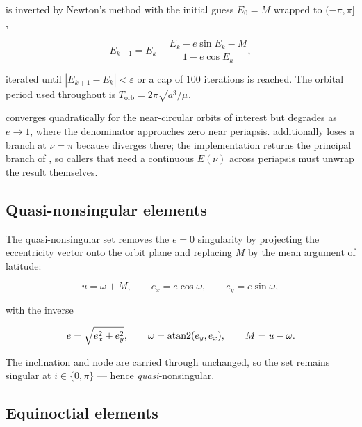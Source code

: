  is inverted by Newton's method with the initial guess
$E_0=M$ wrapped to $(-\pi,\pi]$,

\begin{equation}
  \label{eq:dyn-kepler-newton}
  E_{k+1} = E_k - \frac{E_k - e\sin E_k - M}{1 - e\cos E_k},
\end{equation}

iterated until $|E_{k+1}-E_k| < \varepsilon$ or a cap of $100$ iterations is
reached. The orbital period used throughout is
$T_\mathrm{orb} = 2\pi\sqrt{a^3/\mu}$.

\begin{lupntnote}
   converges quadratically for the near-circular
  orbits of interest but degrades as $e\rightarrow1$, where the denominator
  approaches zero near periapsis.  additionally loses a
  branch at $\nu=\pi$ because  diverges there; the implementation
  returns the principal branch of , so callers that need a continuous
  $E(\nu)$ across periapsis must unwrap the result themselves.
\end{lupntnote}

\subsection{Quasi-nonsingular elements}
\label{sec:dyn-qnsoe}

The quasi-nonsingular set removes the $e=0$ singularity by projecting the
eccentricity vector onto the orbit plane and replacing $M$ by the mean argument
of latitude:

\begin{equation}
  \label{eq:dyn-qnsoe}
  u = \omega + M, \qquad e_x = e\cos\omega, \qquad e_y = e\sin\omega,
\end{equation}

with the inverse

\begin{equation}
  \label{eq:dyn-qnsoe-inv}
  e = \sqrt{e_x^2+e_y^2}, \qquad \omega = \operatorname{atan2}(e_y,e_x), \qquad M = u - \omega .
\end{equation}

The inclination and node are carried through unchanged, so the set remains
singular at $i\in\{0,\pi\}$ --- hence \emph{quasi}-nonsingular.

\subsection{Equinoctial elements}
\label{sec:dyn-equinoctial}

